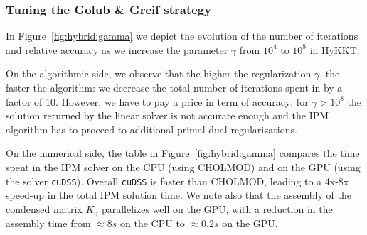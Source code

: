 \begin{table}[!ht]
  \centering
  \caption{Comparing the performance of cuDSS with CHOLMOD.
    The matrix $K_\gamma$ is symmetric positive definite, with
    a size $n = 674,562$. The matrix is extremely sparse, with only $7,342,680$ non-zero entries ($0.002$\%).
    \label{tab:linsol:time}
  }
\end{table}

\subsubsection{Tuning the Golub \& Greif strategy}
\label{sec:num:tuninghykkt}
In Figure~\ref{fig:hybrid:gamma} we depict the evolution of the number
of \CG iterations and relative accuracy as we increase the parameter $\gamma$
from $10^4$ to $10^8$ in HyKKT.

On the algorithmic side, we observe that the higher the regularization $\gamma$,
the faster the \CG algorithm: we decrease the total number of iterations
spent in \CG by a factor of 10. However, we have to pay a price in term
of accuracy: for $\gamma > 10^8$ the solution returned by the linear solver
is not accurate enough and the IPM algorithm has to proceed to additional
primal-dual regularizations.

On the numerical side, the table in Figure~\ref{fig:hybrid:gamma} compares
the time spent in the IPM solver on the CPU (using CHOLMOD) and on the GPU
(using the solver {\tt cuDSS}). Overall {\tt cuDSS} is
faster than CHOLMOD, leading to a 4x-8x speed-up in the total IPM solution time.
We note also that the assembly of the condensed matrix $K_\gamma$ parallelizes well
on the GPU, with a reduction in the assembly time from $\approx 8s$ on the CPU to $\approx 0.2s$ on the GPU.

